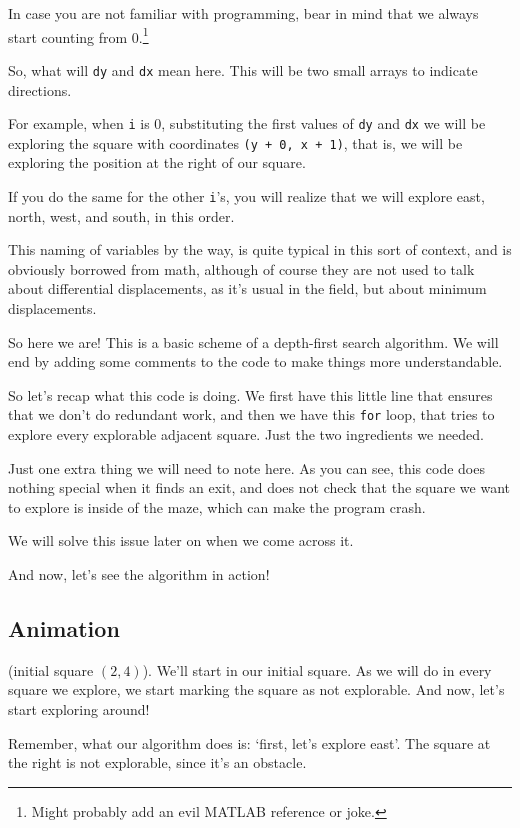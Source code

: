 \documentclass[12pt]{article}
\renewcommand{\v}[1]{\texttt{#1}}
\begin{document}
In case you are not familiar with programming, bear in mind
that we always start counting from 0.\footnote{Might probably add
an evil MATLAB reference or joke.}

So, what will \v{dy} and \v{dx} mean here.
This will be two small arrays to indicate directions.

For example, when \v{i} is 0, substituting
the first values of \v{dy} and \v{dx} we will be exploring
the square with coordinates \v{(y + 0, x + 1)},
that is, we will be exploring the position at the right
of our square.

If you do the same for the other \v{i}'s, you will realize
that we will explore east, north, west, and south, in this order.

This naming of variables by the way, is quite typical
in this sort of context, and is obviously borrowed from math,
although of course they are not used to talk about differential
displacements, as it's usual in the field,
but about minimum displacements.

So here we are! This is a basic scheme of a depth-first
search algorithm. We will end by adding some comments
to the code to make things more understandable.

So let's recap what this code is doing. We first have this
little line that ensures that we don't do redundant work,
and then we have this \v{for} loop, that tries to explore
every explorable adjacent square. Just the two ingredients
we needed.

Just one extra thing we will need to note here.
As you can see, this code does nothing special
when it finds an exit, and does not check that
the square we want to explore is inside of the maze,
which can make the program crash.

We will solve this issue later on when we come across it.

And now, let's see the algorithm in action!

\subsection{Animation}

(initial square $(2, 4)$). We'll start in our initial square.
As we will do in every square we explore, we start marking the square as not
explorable. And now, let's start exploring around!

Remember, what our algorithm does is: `first, let's explore east'.
The square at the right is not explorable, since it's an obstacle.
\end{document}
